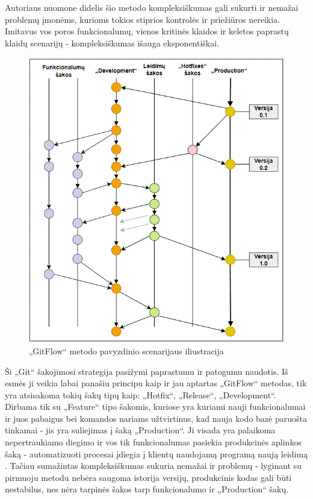 \documentclass{VUMIFPSkursinis}
\begin{document}
Autoriaus nuomone didelis šio metodo kompleksiškumas gali sukurti ir nemažai problemų įmonėms, kurioms tokios stiprios kontrolės ir priežiūros nereikia. Imitavus vos poros funkcionalumų, vienos kritinės klaidos ir keletos paprastų klaidų scenarijų - kompleksiškumas išauga eksponentiškai.

\begin{figure}[H]
    \centering
    \includegraphics[scale=0.6]{img/GitFlowBold.png}
    \caption{„GitFlow“ metodo pavyzdinio scenarijaus iliustracija}
    \label{img:mlp}
\end{figure}


Ši „Git“ šakojimosi strategija pasižymi paprastumu ir patogumu naudotis. Iš esmės ji veikia labai panašiu principu kaip ir jau aptartas „GitFlow“ metodas, tik yra atsisakoma tokių šakų tipų kaip: „Hotfix“, „Release“, „Development“. Dirbama tik su „Feature“ tipo šakomis, kuriose yra kuriami nauji funkcionalumai ir juos pabaigus bei komandos nariams užtvirtinus, kad nauja kodo bazė paruošta tinkamai - jis yra suliejimas į šaką „Production“. Ji visada yra palaikoma nepertraukiamo diegimo ir vos tik funkcionalumas pasiekia produkcinės aplinkos šaką - automatizuoti procesai įdiegia į klientų naudojamą programą naują leidimą \cite{SaltDevintas}. Tačiau sumažintas kompleksiškumas sukuria nemažai ir problemų - lyginant su pirmuoju metodu nebėra saugoma istorija versijų, produkcinis kodas gali būti nestabilus, nes nėra tarpinės šakos tarp funkcionalumo ir „Production“ šakų.
\end{document}
